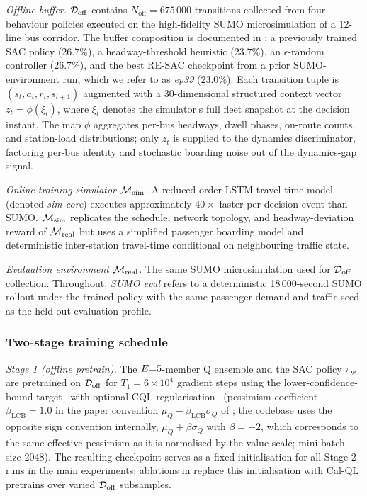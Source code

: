 \textit{Offline buffer.} $\mathcal{D}_{\mathrm{off}}$ contains $N_{\text{off}} = 675\,000$ transitions collected from four behaviour policies executed on the high-fidelity SUMO microsimulation of a 12-line bus corridor.
The buffer composition is documented in : a previously trained SAC policy ($26.7\%$), a headway-threshold heuristic ($23.7\%$), an $\epsilon$-random controller ($26.7\%$), and the best RE-SAC checkpoint from a prior SUMO-environment run, which we refer to as \emph{ep39} ($23.0\%$).
Each transition tuple is $(s_t, a_t, r_t, s_{t+1})$ augmented with a $30$-dimensional structured context vector $z_t = \phi(\xi_t)$, where $\xi_t$ denotes the simulator's full fleet snapshot at the decision instant.
The map $\phi$ aggregates per-bus headways, dwell phases, on-route counts, and station-load distributions; only $z_t$ is supplied to the dynamics discriminator, factoring per-bus identity and stochastic boarding noise out of the dynamics-gap signal.

\textit{Online training simulator $\mathcal{M}_{\mathrm{sim}}$.}
A reduced-order LSTM travel-time model (denoted \emph{sim-core}) executes approximately $40\times$ faster per decision event than SUMO.
$\mathcal{M}_{\mathrm{sim}}$ replicates the schedule, network topology, and headway-deviation reward of $\mathcal{M}_{\mathrm{real}}$ but uses a simplified passenger boarding model and deterministic inter-station travel-time conditional on neighbouring traffic state.

\textit{Evaluation environment $\mathcal{M}_{\mathrm{real}}$.}
The same SUMO microsimulation used for $\mathcal{D}_{\mathrm{off}}$ collection.
Throughout, \emph{SUMO eval} refers to a deterministic 18\,000-second SUMO rollout under the trained policy with the same passenger demand and traffic seed as the held-out evaluation profile.

\subsubsection{Two-stage training schedule}
\label{sec:method:stages}

\textit{Stage 1 (offline pretrain).}
The $E{=}5$-member Q ensemble and the SAC policy $\pi_\phi$ are pretrained on $\mathcal{D}_{\mathrm{off}}$ for $T_1 = 6\times10^4$ gradient steps using the lower-confidence-bound target~\citep{an2021uncertainty} with optional CQL regularisation~\citep{kumar2020cql} (pessimism coefficient $\beta_{\text{LCB}} = 1.0$ in the paper convention $\mu_Q - \beta_{\text{LCB}}\sigma_Q$ of ; the codebase uses the opposite sign convention internally, $\mu_Q + \beta\sigma_Q$ with $\beta = -2$, which corresponds to the same effective pessimism as it is normalised by the value scale; mini-batch size $2048$).
The resulting checkpoint serves as a fixed initialisation for all Stage 2 runs in the main experiments; ablations in  replace this initialisation with Cal-QL pretrains over varied $\mathcal{D}_{\mathrm{off}}$ subsamples.

